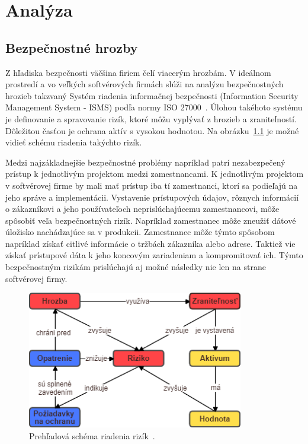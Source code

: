 \chapter{Analýza}\label{ch:analýza}

\section{Bezpečnostné hrozby}\label{sec:bezpecnostne-hrozby}
\par Z hľadiska bezpečnosti väčšina firiem čelí viacerým hrozbám.
V ideálnom prostredí a vo veľkých softvérových firmách slúži na analýzu bezpečnostných hrozieb takzvaný Systém riadenia
informačnej bezpečnosti (Information Security Management System - ISMS) podľa normy ISO 27000~\cite{ISO27001:2013}.
Úlohou takéhoto systému je definovanie a spravovanie rizík, ktoré môžu vyplývať z hrozieb a zraniteľností.
Dôležitou časťou je ochrana aktív s vysokou hodnotou.
Na obrázku~\ref{fig:obr_1} je možné vidieť schému riadenia takýchto rizík.

Medzi najzákladnejšie bezpečnostné problémy napríklad patrí nezabezpečený prístup k jednotlivým projektom medzi zamestnancami.
K jednotlivým projektom v softvérovej firme by mali mať prístup iba tí zamestnanci, ktorí sa podieľajú na jeho správe a implementácii.
Vystavenie prístupových údajov, rôznych informácií o zákazníkovi a jeho používateľoch neprislúchajúcemu zamestnancovi,
môže spôsobiť veľa bezpečnostných rizík.
Napríklad zamestnanec môže zneužiť dátové úložisko nachádzajúce sa v produkcii.
Zamestnanec môže týmto spôsobom napríklad získať citlivé informácie o tržbách zákazníka alebo adrese.
Taktiež vie získať prístupové dáta k jeho koncovým zariadeniam a kompromitovať ich.
Týmto bezpečnostným rizikám prislúchajú aj možné následky nie len na strane softvérovej firmy.

\begin{figure}[H]
\begin{center}\includegraphics[width=\textwidth,height=6cm,keepaspectratio=true]{assets/risks.png}\end{center}
\caption[Prehľadová schéma riadenia rizík]{Prehľadová schéma riadenia rizík~\cite{RiskManagement}.}\label{fig:obr_1}
\end{figure}

